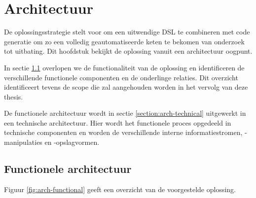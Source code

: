 
\chapter{Architectuur}
\label{chapter:architectuur}

De oplossingsstrategie stelt voor om een uitwendige DSL te combineren met code
generatie om zo een volledig geautomatiseerde keten te bekomen van onderzoek
tot uitbating. Dit hoofdstuk bekijkt de oplossing vanuit een architectuur
oogpunt.

In sectie \ref{section:arch-functional} overlopen we de functionaliteit van de
oplossing en identificeren de verschillende functionele componenten en de
onderlinge relaties. Dit overzicht identificeert tevens de scope die zal
aangehouden worden in het vervolg van deze thesis.

De functionele architectuur wordt in sectie \ref{section:arch-technical}
uitgewerkt in een technische architectuur. Hier wordt het functionele proces
opgedeeld in technische componenten en worden de verschillende interne
informatiestromen, -manipulaties en -opslagvormen.

\section{Functionele architectuur}
\label{section:arch-functional}

Figuur \ref{fig:arch-functional} geeft een overzicht van de voorgestelde
oplossing.

